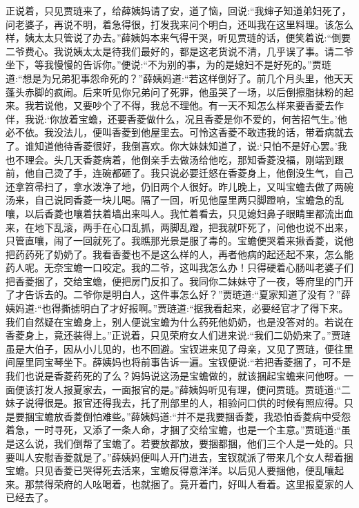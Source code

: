 \begin{parag}
    正说着，只见贾琏来了，给薛姨妈请了安，道了恼，回说:“我婶子知道弟妇死了，问老婆子，再说不明，着急得很，打发我来问个明白，还叫我在这里料理。该怎么样，姨太太只管说了办去。”薛姨妈本来气得干哭，听见贾琏的话，便笑着说:“倒要二爷费心。我说姨太太是待我们最好的，都是这老货说不清，几乎误了事。请二爷坐下，等我慢慢的告诉你。”便说:“不为别的事，为的是媳妇不是好死的。”贾琏道:“想是为兄弟犯事怨命死的？”薛姨妈道:“若这样倒好了。前几个月头里，他天天蓬头赤脚的疯闹。后来听见你兄弟问了死罪，他虽哭了一场，以后倒擦脂抹粉的起来。我若说他，又要吵个了不得，我总不理他。有一天不知怎么样来要香菱去作伴，我说:‘你放着宝蟾，还要香菱做什么，况且香菱是你不爱的，何苦招气生。’他必不依。我没法儿，便叫香菱到他屋里去。可怜这香菱不敢违我的话，带着病就去了。谁知道他待香菱很好，我倒喜欢。你大妹妹知道了，说:‘只怕不是好心罢。’我也不理会。头几天香菱病着，他倒亲手去做汤给他吃，那知香菱没福，刚端到跟前，他自己烫了手，连碗都砸了。我只说必要迁怒在香菱身上，他倒没生气，自己还拿笤帚扫了，拿水泼净了地，仍旧两个人很好。昨儿晚上，又叫宝蟾去做了两碗汤来，自己说同香菱一块儿喝。隔了一回，听见他屋里两只脚蹬响，宝蟾急的乱嚷，以后香菱也嚷着扶着墙出来叫人。我忙着看去，只见媳妇鼻子眼睛里都流出血来，在地下乱滚，两手在心口乱抓，两脚乱蹬，把我就吓死了，问他也说不出来，只管直嚷，闹了一回就死了。我瞧那光景是服了毒的。宝蟾便哭着来揪香菱，说他把药药死了奶奶了。我看香菱也不是这么样的人，再者他病的起还起不来，怎么能药人呢。无奈宝蟾一口咬定。我的二爷，这叫我怎么办！只得硬着心肠叫老婆子们把香菱捆了，交给宝蟾，便把房门反扣了。我同你二妹妹守了一夜，等府里的门开了才告诉去的。二爷你是明白人，这件事怎么好？”贾琏道:“夏家知道了没有？”薛姨妈道:“也得撕掳明白了才好报啊。”贾琏道:“据我看起来，必要经官才了得下来。我们自然疑在宝蟾身上，别人便说宝蟾为什么药死他奶奶，也是没答对的。若说在香菱身上，竟还装得上。”正说着，只见荣府女人们进来说:“我们二奶奶来了。”贾琏虽是大伯子，因从小儿见的，也不回避。宝钗进来见了母亲，又见了贾琏，便往里间屋里同宝琴坐下。薛姨妈也将前事告诉一遍。宝钗便说:“若把香菱捆了，可不是我们也说是香菱药死的了么？妈妈说这汤是宝蟾做的，就该捆起宝蟾来问他呀。一面便该打发人报夏家去，一面报官的是。”薛姨妈听见有理，便问贾琏。贾琏道:“二妹子说得很是。报官还得我去，托了刑部里的人，相验问口供的时候有照应得。只是要捆宝蟾放香菱倒怕难些。”薛姨妈道:“并不是我要捆香菱，我恐怕香菱病中受怨着急，一时寻死，又添了一条人命，才捆了交给宝蟾，也是一个主意。”贾琏道:“虽是这么说，我们倒帮了宝蟾了。若要放都放，要捆都捆，他们三个人是一处的。只要叫人安慰香菱就是了。”薛姨妈便叫人开门进去，宝钗就派了带来几个女人帮着捆宝蟾。只见香菱已哭得死去活来，宝蟾反得意洋洋。以后见人要捆他，便乱嚷起来。那禁得荣府的人吆喝着，也就捆了。竟开着门，好叫人看着。这里报夏家的人已经去了。
\end{parag}


